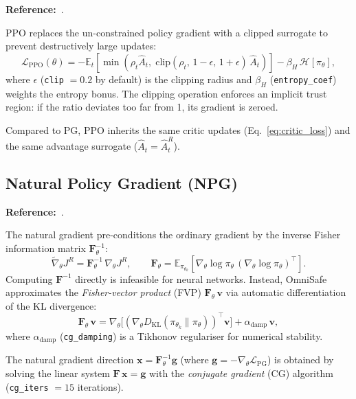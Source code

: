 \documentclass[12pt,a4paper]{article}
\theoremstyle{definition}
\newcommand{\E}{\mathbb{E}}
\newcommand{\piold}{\pi_{\theta_k}}
\newcommand{\KL}{D_{\mathrm{KL}}}
\newcommand{\Fmat}{\mathbf{F}}
\newcommand{\gvec}{\mathbf{g}}
\newcommand{\xvec}{\mathbf{x}}
\begin{document}
\textbf{Reference:}~\citet{schulman2017proximal}.

PPO replaces the un-constrained policy gradient with a clipped surrogate to prevent
destructively large updates:
\begin{equation}
  \label{eq:ppo_loss}
  \mathcal{L}_{\mathrm{PPO}}(\theta) = -\E_t\!\left[
    \min\!\left(\rho_t\hat{A}_t,\;\mathrm{clip}(\rho_t,\,1-\epsilon,\,1+\epsilon)\,\hat{A}_t\right)
  \right]
  - \beta_H \,\mathcal{H}[\pi_\theta],
\end{equation}
where $\epsilon$ (\texttt{clip} $= 0.2$ by default) is the clipping radius and $\beta_H$
(\texttt{entropy\_coef}) weights the entropy bonus. The clipping operation enforces an implicit
trust region: if the ratio deviates too far from 1, its gradient is zeroed.

Compared to PG, PPO inherits the same critic updates (Eq.~\ref{eq:critic_loss}) and the
same advantage surrogate ($\hat{A}_t = \hat{A}_t^R$).

\subsection{Natural Policy Gradient (NPG)}
\label{sec:npg}

\textbf{Reference:}~\citet{kakade2001natural}.

The natural gradient pre-conditions the ordinary gradient by the inverse Fisher information
matrix $\Fmat_\theta^{-1}$:
\begin{equation}
  \tilde{\nabla}_\theta J^R = \Fmat_\theta^{-1}\,\nabla_\theta J^R,
  \qquad
  \Fmat_\theta = \E_{\piold}\!\left[\nabla_\theta\log\pi_\theta\,(\nabla_\theta\log\pi_\theta)^\top\right].
\end{equation}
Computing $\Fmat^{-1}$ directly is infeasible for neural networks.  Instead, OmniSafe
approximates the \emph{Fisher-vector product} (FVP) $\Fmat_\theta\,\mathbf{v}$ via
automatic differentiation of the KL divergence:
\begin{equation}
  \label{eq:fvp}
  \Fmat_\theta\,\mathbf{v}
  = \nabla_\theta\!\bigl[(\nabla_\theta \KL(\piold \| \pi_\theta))^\top\mathbf{v}\bigr]
  + \alpha_{\mathrm{damp}}\,\mathbf{v},
\end{equation}
where $\alpha_{\mathrm{damp}}$ (\texttt{cg\_damping}) is a Tikhonov regulariser for numerical
stability.

The natural gradient direction $\xvec = \Fmat_\theta^{-1}\gvec$ (where
$\gvec = -\nabla_\theta \mathcal{L}_{\mathrm{PG}}$) is obtained by solving the linear system
$\Fmat\,\xvec = \gvec$ with the \emph{conjugate gradient} (CG) algorithm
(\texttt{cg\_iters} $= 15$ iterations).
\end{document}
